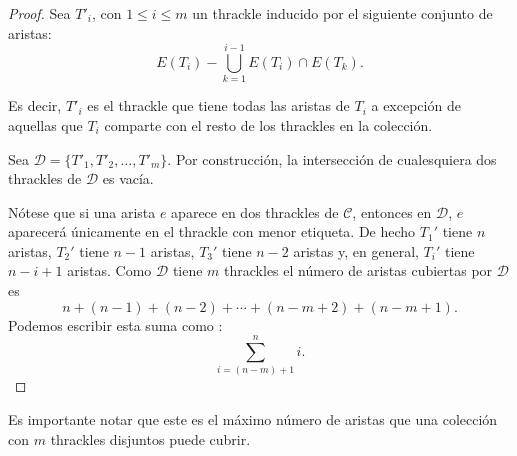   \begin{proof}
    Sea $T'_i$, con $1 \leq i \leq m$ un thrackle inducido por el siguiente
    conjunto de aristas:
    \[E(T_i) - \bigcup_{k=1}^{i-1} E(T_i)\cap E(T_k).\]

    Es decir, $T'_i$ es el thrackle que tiene todas las aristas de $T_i$
    a excepción de aquellas que $T_i$ comparte con el resto de los thrackles
    en la colección.

    Sea $\mathcal{D}=\{T'_1,T'_2,\dots,T'_m\}$. Por construcción, la intersección
    de cualesquiera dos thrackles de $\mathcal{D}$ es vacía.

    Nótese que si una arista $e$ aparece en dos thrackles de $\mathcal{C}$,
    entonces en $\mathcal{D}$, $e$ aparecerá únicamente en el thrackle con menor
    etiqueta.
    De hecho $T_1'$ tiene $n$ aristas, $T_2'$ tiene $n-1$ aristas, $T_3'$ tiene
    $n-2$ aristas y, en general, $T_i'$ tiene $n-i+1$ aristas. Como $\mathcal{D}$
    tiene $m$ thrackles el número de aristas cubiertas por $\mathcal{D}$ es
    \[ n + (n-1) + (n-2) + \cdots + (n- m + 2) + (n - m + 1).\]
    Podemos escribir esta suma como :
    \[\displaystyle \sum^n_{i=(n-m) + 1}i.\]
  \end{proof}
  Es importante notar que este es el máximo número de aristas que una colección
  con $m$ thrackles disjuntos puede cubrir.

